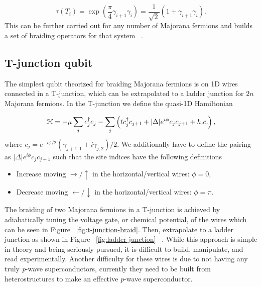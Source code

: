 \begin{equation}
  \tau(T_i) = \exp\left(\dfrac{\pi}{4} \gamma_{i+1} \gamma_i\right) = \dfrac{1}{\sqrt{2}} \left(1+ \gamma_{i+1} \gamma_i\right).
\end{equation}
This can be further carried out for any number of Majorana fermions and builds a set of braiding operators for that system ~\cite{ivanovNonAbelianStatisticsHalfQuantum2001}.

\subsection{T-junction qubit}
The simplest qubit theorized for braiding Majorana fermions is on 1D wires connected in a T-junction, which can be extrapolated to a ladder junction for $2n$ Majorana fermions.
In the T-junction we define the quasi-1D Hamiltonian

\begin{equation}
  \mathcal{H} = -\mu \sum_j c^{\dagger}_j c_j - \sum_j \left(tc^{\dagger}_j c_{j+1} + |\Delta|e^{i\phi} c_j c_{j+1} + h.c. \right),
\end{equation}
where
$c_j = e^{-i\phi/2} (\gamma_{j+1,1} + i \gamma_{j,2})/2$.
We additionally have to define the pairing as
$|\Delta|e^{i\phi} c_j c_{j+1}$
such that the site indices have the following definitions
\begin{itemize}
  \item Increase moving $\rightarrow / \uparrow$ in the horizontal/vertical wires: $\phi = 0$,
  \item Decrease moving $\leftarrow / \downarrow$ in the horizontal/vertical wires: $\phi = \pi$.
\end{itemize}
The braiding of two Majorana fermions in a T-junction is achieved by adiabatically tuning the voltage gate, or chemical potential, of the wires which can be seen in Figure ~\ref{fig:t-junction-braid}.
Then, extrapolate to a ladder junction as shown in Figure ~\ref{fig:ladder-junction} ~\cite{aliceaNonAbelianStatisticsTopological2011}.
While this approach is simple in theory and being seriously pursued, it is difficult to build, manipulate, and read experimentally.
Another difficulty for these wires is due to not having any truly \textit{p}-wave superconductors, currently they need to be built from heterostructures to make an effective \textit{p}-wave superconductor.

